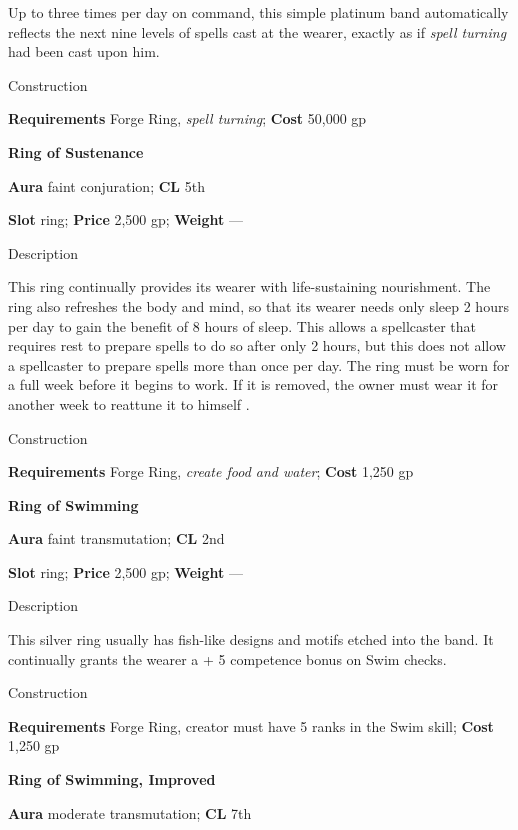 Up to three times per day on command, this simple platinum band automatically reflects the next nine levels of spells cast at the wearer, exactly as if \textit{spell turning }
had been cast
 upon him. 
				
Construction
				
\textbf{Requirements} Forge Ring, \textit{spell turning}; \textbf{Cost }50,000 gp
				
\textbf{Ring of Sustenance}
				
\textbf{Aura} faint conjuration;\textbf{ CL }5th
				
\textbf{Slot} ring; \textbf{Price} 2,500 gp; \textbf{Weight} ---
				
Description
				
This ring continually provides its wearer with life-sustaining nourishment. The ring also refreshes the body and mind, so that its wearer needs only sleep 2 hours per day to gain the benefit of 8 hours of sleep. This allows a spellcaster that requires rest to prepare spells to do so after only 2 hours, but this does not allow a spellcaster to prepare spells more than once per day. The ring 
must be worn
 for a full week before it begins to work. If it is removed, the owner must wear it for another week to reattune it to 
himself
. 
				
Construction
				
\textbf{Requirements} Forge Ring, \textit{create food and water}; \textbf{Cost }1,250 gp
				
\textbf{Ring of Swimming}
				
\textbf{Aura} faint transmutation;\textbf{ CL }2nd
				
\textbf{Slot} ring; \textbf{Price} 2,500 gp; \textbf{Weight} ---
				
Description
				
This silver ring usually has fish-like designs and motifs etched into the band. It continually grants the wearer a +
5 competence
 bonus on Swim checks. 
				
Construction
				
\textbf{Requirements} Forge Ring, creator must have 5 ranks in the Swim skill; \textbf{Cost }1,250 gp
				
\textbf{Ring of Swimming, Improved}
				
\textbf{Aura} moderate transmutation;\textbf{ CL }7th
				
